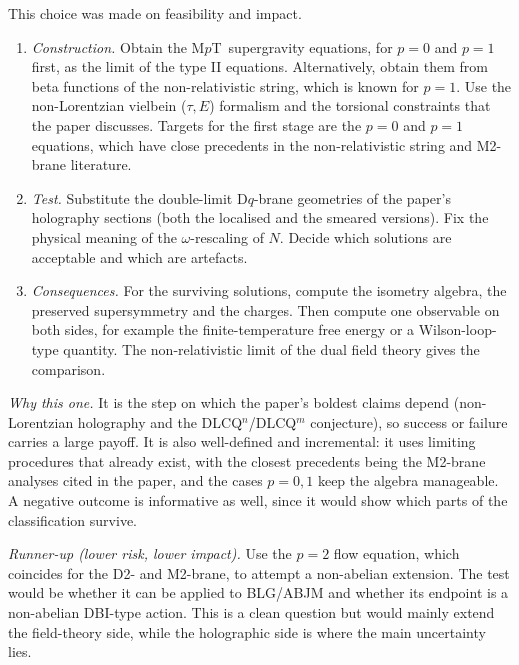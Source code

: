\documentclass[11pt,a4paper]{article}
\newcommand{\MpT}{M$p$T}
\begin{document}
This choice was made on feasibility and impact.
\begin{enumerate}
\item \emph{Construction.} Obtain the \MpT\ supergravity equations, for $p=0$ and $p=1$ first, as the limit of the type II equations. Alternatively, obtain them from beta functions of the non-relativistic string, which is known for $p=1$. Use the non-Lorentzian vielbein ($\tau,E$) formalism and the torsional constraints that the paper discusses. Targets for the first stage are the $p=0$ and $p=1$ equations, which have close precedents in the non-relativistic string and M2-brane literature.
\item \emph{Test.} Substitute the double-limit D$q$-brane geometries of the paper's holography sections (both the localised and the smeared versions). Fix the physical meaning of the $\omega$-rescaling of $N$. Decide which solutions are acceptable and which are artefacts.
\item \emph{Consequences.} For the surviving solutions, compute the isometry algebra, the preserved supersymmetry and the charges. Then compute one observable on both sides, for example the finite-temperature free energy or a Wilson-loop-type quantity. The non-relativistic limit of the dual field theory gives the comparison.
\end{enumerate}

\emph{Why this one.} It is the step on which the paper's boldest claims depend (non-Lorentzian holography and the DLCQ$^n$/DLCQ$^m$ conjecture), so success or failure carries a large payoff. It is also well-defined and incremental: it uses limiting procedures that already exist, with the closest precedents being the M2-brane analyses cited in the paper, and the cases $p=0,1$ keep the algebra manageable. A negative outcome is informative as well, since it would show which parts of the classification survive.

\emph{Runner-up (lower risk, lower impact).} Use the $p=2$ flow equation, which coincides for the D2- and M2-brane, to attempt a non-abelian extension. The test would be whether it can be applied to BLG/ABJM and whether its endpoint is a non-abelian DBI-type action. This is a clean question but would mainly extend the field-theory side, while the holographic side is where the main uncertainty lies.
\end{document}
